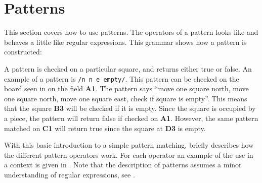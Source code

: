 \section{Patterns}
\label{sec:patterns}

This section covers how to use patterns. The operators of a pattern looks 
like and behaves a little like regular expressions. This
grammar shows how a pattern is constructed:

\begin{ebnf}
\end{ebnf}


A pattern is checked on a particular square, and returns either true or false.
An example of a pattern is \texttt{/n n e empty/}. This pattern can be checked on
the board seen in  on the field \textbf{A1}. The pattern
says ``move one square north, move one square north, move one square east, check if
square is empty''. This means that the square \textbf{B3} will be checked if it
is empty. Since the square is occupied by a piece, the pattern will return
false if checked on \textbf{A1}. However, the same pattern matched on
\textbf{C1} will return true since the square at \textbf{D3} is empty.


With this basic introduction to a simple pattern matching,
 briefly describes how the different pattern
operators work. For each operator an example of the use in a context is given
in . Note that the description of patterns assumes a
minor understanding of regular expressions, see \cite{regex}\cite{perlRegex}.

